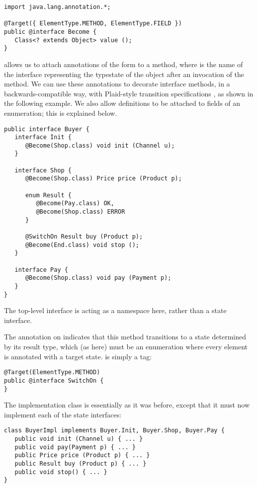 \begin{lstlisting}
import java.lang.annotation.*;

@Target({ ElementType.METHOD, ElementType.FIELD })
public @interface Become {
   Class<? extends Object> value ();
}
\end{lstlisting}

\noindent {} allows us to attach annotations of the form
 to a method, where  is the name
of the interface representing the typestate of the object after an
invocation of the method. We can use these annotations to decorate
interface methods, in a backwards-compatible way, with Plaid-style
transition specifications \cite{garcia14}, as shown in the following
example. We also allow  definitions to be attached to
fields of an enumeration; this is explained below.

\begin{lstlisting}
public interface Buyer {
   interface Init {
      @Become(Shop.class) void init (Channel u);
   }

   interface Shop {
      @Become(Shop.class) Price price (Product p);

      enum Result {
         @Become(Pay.class) OK,
         @Become(Shop.class) ERROR
      }

      @SwitchOn Result buy (Product p);
      @Become(End.class) void stop ();
   }

   interface Pay {
      @Become(Shop.class) void pay (Payment p);
   }
}
\end{lstlisting}

\noindent The top-level  interface is acting as a
namespace here, rather than a state interface.

The  annotation on  indicates that this method
transitions to a state determined by its result type, which (as here)
must be an enumeration where every element is annotated with a target
state.  is simply a tag:
\begin{lstlisting}
@Target(ElementType.METHOD)
public @interface SwitchOn {
}
\end{lstlisting}

The implementation class  is essentially as it was
before, except that it must now implement each of the state
interfaces:

\begin{lstlisting}
class BuyerImpl implements Buyer.Init, Buyer.Shop, Buyer.Pay {
   public void init (Channel u) { ... }
   public void pay(Payment p) { ... }
   public Price price (Product p) { ... }
   public Result buy (Product p) { ... }
   public void stop() { ... }
}
\end{lstlisting}

